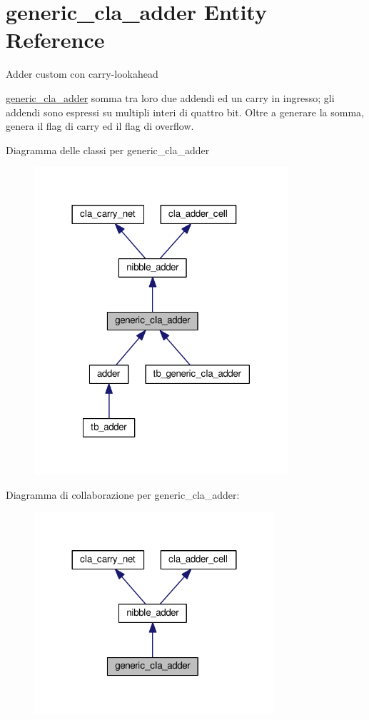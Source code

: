 \hypertarget{classgeneric__cla__adder}{\section{generic\+\_\+cla\+\_\+adder Entity Reference}
\label{classgeneric__cla__adder}
}


Adder custom con carry-\/lookahead

\hyperlink{classgeneric__cla__adder}{generic\+\_\+cla\+\_\+adder} somma tra loro due addendi ed un carry in ingresso; gli addendi sono espressi su multipli interi di quattro bit. Oltre a generare la somma, genera il flag di carry ed il flag di overflow.  




Diagramma delle classi per generic\+\_\+cla\+\_\+adder
\nopagebreak
\begin{figure}[H]
\begin{center}
\leavevmode
\includegraphics[width=266pt]{classgeneric__cla__adder__inherit__graph}
\end{center}
\end{figure}


Diagramma di collaborazione per generic\+\_\+cla\+\_\+adder\+:\nopagebreak
\begin{figure}[H]
\begin{center}
\leavevmode
\includegraphics[width=252pt]{classgeneric__cla__adder__coll__graph}
\end{center}
\end{figure}
